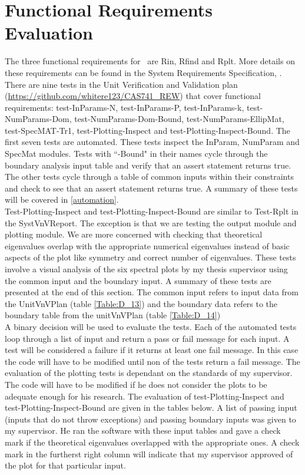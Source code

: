 \documentclass[12pt, titlepage]{article}
\begin{document}
\section{Functional Requirements Evaluation} \label{funct}

The three functional requirements for \progname \ are Rin, Rfind and 
Rplt. More details on these requirements can be found in the System 
Requirements Specification, \cite{SRS}. There are nine tests in the Unit 
Verification and Validation plan 
(\url{https://github.com/whitere123/CAS741_REW}) that cover functional 
requirements: test-InParams-N, test-InParams-P, test-InParams-k, 
test-NumParams-Dom, test-NumParams-Dom-Bound, test-NumParams-EllipMat, 
test-SpecMAT-Tr1, test-Plotting-Inspect and test-Plotting-Inspect-Bound. The 
first seven tests are automated. These tests inspect the InParam, NumParam 
and SpecMat modules. Tests with ``-Bound" in their names cycle through the 
boundary analysis input table and verify that an assert statement returns true. 
The other tests cycle through a table of common inputs within their constraints 
and check to see that an assert statement returns true. A summary of these 
tests will be covered in \ref{automation}. \\
Test-Plotting-Inspect and test-Plotting-Inspect-Bound are similar to Test-Rplt 
in the SystVnVReport. The exception is that we are testing the output module 
and plotting module. We are more concerned with checking that theoretical 
eigenvalues overlap with the appropriate numerical eigenvalues instead of basic 
aspects of the plot like symmetry and correct number of eigenvalues. These 
tests involve a visual analysis of the six spectral plots by my thesis 
supervisor using the common input and the boundary input. A summary of these 
tests are presented at the end of this section. The common input refers to 
input data from the UnitVnVPlan (table \ref{Table:D_13}) and the boundary data 
refers to the boundary table from the unitVnVPlan (table \ref{Table:D_14}) \\ 
A binary decision will be used to evaluate the tests. Each of the automated 
tests loop through a list of input and return a pass or fail message for each 
input. A test will be considered a failure if it returns at least one 
fail 
message. In this case the code will have to be modified until non of the tests 
return a fail message. The evaluation of the plotting tests is dependant on the 
standards of my supervisor. The code will have to be modified if he does not 
consider the plots to be adequate enough for his research. The evaluation of 
test-Plotting-Inspect and test-Plotting-Inspect-Bound are given in the tables 
below. A list of passing input (inputs that do 
not throw exceptions) and passing boundary inputs was given to my supervisor. 
He ran the software with 
these input tables and gave a check mark if the theoretical eigenvalues 
overlapped 
with the appropriate ones. A check mark in the furtherst right column will 
indicate that my supervisor approved of the plot for that particular input.  
\end{document}
